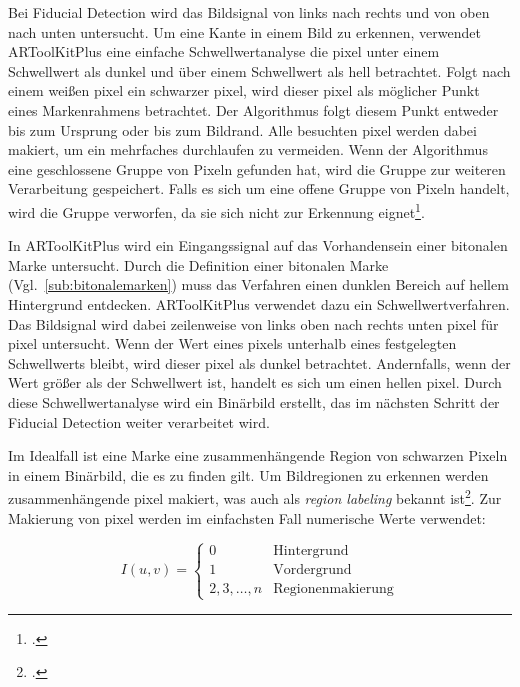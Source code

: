 Bei Fiducial Detection wird das Bildsignal von links nach rechts und von oben nach unten untersucht. Um eine Kante in
 einem Bild zu erkennen, verwendet ARToolKitPlus eine einfache Schwellwertanalyse die \gls{pixel} unter einem
 Schwellwert als dunkel und über einem Schwellwert als hell betrachtet. Folgt nach einem weißen \gls{pixel} ein
 schwarzer \gls{pixel}, wird dieser \gls{pixel} als möglicher Punkt eines Markenrahmens betrachtet. Der Algorithmus
 folgt diesem Punkt entweder bis zum Ursprung oder bis zum Bildrand. Alle besuchten \gls{pixel} werden dabei makiert,
 um ein mehrfaches durchlaufen zu vermeiden. Wenn der Algorithmus eine geschlossene Gruppe von Pixeln gefunden
 hat, wird die Gruppe zur weiteren Verarbeitung gespeichert. Falls es sich um eine offene Gruppe von Pixeln
 handelt, wird die Gruppe verworfen, da sie sich nicht zur Erkennung eignet\footcite[Vgl.][S.~41--42]{wagner07a}.

In ARToolKitPlus wird ein Eingangssignal auf das Vorhandensein einer bitonalen Marke untersucht. Durch die Definition
 einer bitonalen Marke (Vgl.~\autoref{sub:bitonalemarken}) muss das Verfahren einen dunklen Bereich auf hellem
 Hintergrund entdecken. ARToolKitPlus verwendet dazu ein Schwellwertverfahren. Das Bildsignal wird dabei zeilenweise
 von links oben nach rechts unten \gls{pixel} für \gls{pixel} untersucht. Wenn der Wert eines \glspl{pixel} unterhalb
 eines festgelegten Schwellwerts bleibt, wird dieser \gls{pixel} als dunkel betrachtet. Andernfalls, wenn der Wert
 größer als der Schwellwert ist, handelt es sich um einen hellen \gls{pixel}. Durch diese Schwellwertanalyse wird ein
 Binärbild erstellt, das im nächsten Schritt der Fiducial Detection weiter verarbeitet wird.

Im Idealfall ist eine Marke eine zusammenhängende Region von schwarzen Pixeln in einem Binärbild, die es zu finden
 gilt. Um Bildregionen zu erkennen werden zusammenhängende \gls{pixel} makiert, was auch als \textit{region labeling}
 bekannt ist\footcite[Vgl.][S.~196]{burger05}. Zur Makierung von \gls{pixel} werden im einfachsten Fall numerische
 Werte verwendet:

\begin{equation*}
	I(u,v) = \begin{cases}
	0 & \textrm{Hintergrund}\\
	1 & \textrm{Vordergrund}\\
	2,3,\ldots,n & \textrm{Regionenmakierung}
	\end{cases}
\end{equation*}

